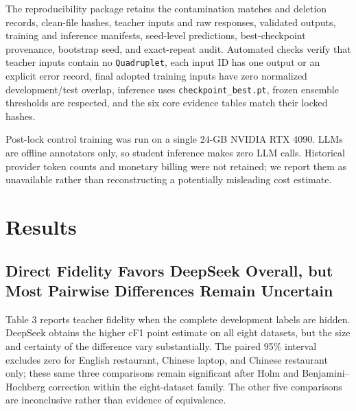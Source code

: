 The reproducibility package retains the contamination matches and
deletion records, clean-file hashes, teacher inputs and raw responses,
validated outputs, training and inference manifests, seed-level
predictions, best-checkpoint provenance, bootstrap seed, and
exact-repeat audit. Automated checks verify that teacher inputs contain
no \texttt{Quadruplet}, each input ID has one output or an explicit
error record, final adopted training inputs have zero normalized
development/test overlap, inference uses \texttt{checkpoint\_best.pt},
frozen ensemble thresholds are respected, and the six core evidence
tables match their locked hashes.

Post-lock control training was run on a single 24-GB NVIDIA RTX 4090.
LLMs are offline annotators only, so student inference makes zero LLM
calls. Historical provider token counts and monetary billing were not
retained; we report them as unavailable rather than reconstructing a
potentially misleading cost estimate.

\section{Results}\label{results}

\subsection{Direct Fidelity Favors DeepSeek Overall, but Most Pairwise
Differences Remain
Uncertain}\label{direct-fidelity-favors-deepseek-overall-but-most-pairwise-differences-remain-uncertain}

Table 3 reports teacher fidelity when the complete development labels
are hidden. DeepSeek obtains the higher cF1 point estimate on all eight
datasets, but the size and certainty of the difference vary
substantially. The paired 95\% interval excludes zero for English
restaurant, Chinese laptop, and Chinese restaurant only; these same
three comparisons remain significant after Holm and Benjamini--Hochberg
correction within the eight-dataset family. The other five comparisons
are inconclusive rather than evidence of equivalence.

